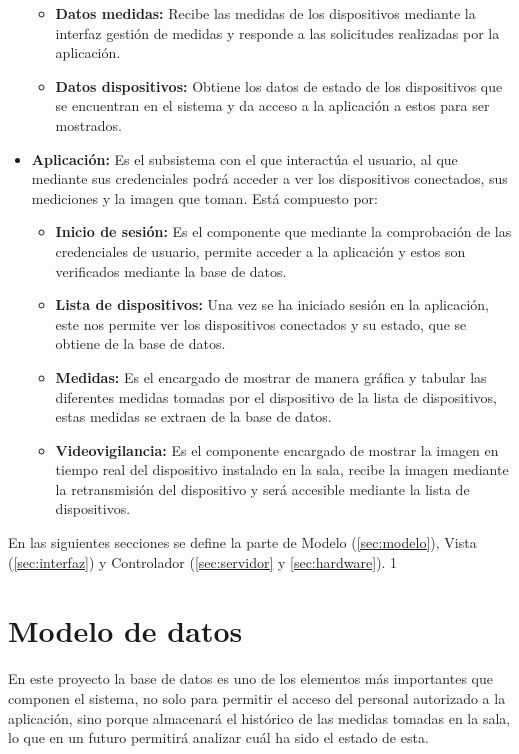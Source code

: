 \begin{itemize}
\begin{itemize}
		      \item \textbf{Datos medidas:} Recibe las medidas de los dispositivos mediante la interfaz gestión de medidas y responde a las solicitudes realizadas por la aplicación.
		      \item \textbf{Datos dispositivos:} Obtiene los datos de estado de los dispositivos que se encuentran en el sistema y da acceso a la aplicación a estos para ser mostrados.
	      \end{itemize}
	\item \textbf{Aplicación:} Es el subsistema con el que interactúa el usuario, al que mediante sus credenciales podrá acceder a ver los dispositivos conectados, sus mediciones y la imagen que toman. Está compuesto por:
	      \begin{itemize}
		      \item \textbf{Inicio de sesión:} Es el componente que mediante la comprobación de las credenciales de usuario, permite acceder a la aplicación y estos son verificados mediante la base de datos.
		      \item \textbf{Lista de dispositivos:} Una vez se ha iniciado sesión en la aplicación, este nos permite ver los dispositivos conectados y su estado, que se obtiene de la base de datos.
		      \item \textbf{Medidas:} Es el encargado de mostrar de manera gráfica y tabular las diferentes medidas tomadas por el dispositivo de la lista de dispositivos, estas medidas se extraen de la base de datos.
		      \item \textbf{Videovigilancia:} Es el componente encargado de mostrar la imagen en tiempo real del dispositivo instalado en la sala, recibe la imagen mediante la retransmisión del dispositivo y será accesible mediante la lista de dispositivos.
	      \end{itemize}
\end{itemize}

En las siguientes secciones se define la parte de Modelo (\autoref{sec:modelo}), Vista (\autoref{sec:interfaz}) y Controlador (\autoref{sec:servidor} y \autoref{sec:hardware}).
1\pagebreak

\section{Modelo de datos}\label{sec:modelo}
En este proyecto la base de datos es uno de los elementos más importantes que componen el sistema, no solo para permitir el acceso del personal autorizado a la aplicación, sino porque almacenará el histórico de las medidas tomadas en la sala, lo que en un futuro permitirá analizar cuál ha sido el estado de esta.

